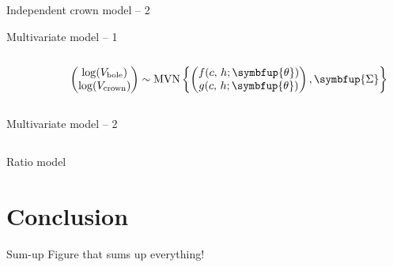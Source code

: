 \documentclass[sectiontocframe default=off, aspectratio=169]{beamer}
\newcommand{\Vbft}{V_{\text{bole}}}
\newcommand{\Vcrn}{V_{\text{crown}}}
\newcommand{\Sigmabf}{\symbfup{\Sigma}}
\DeclareMathOperator{\MVN}{MVN}
\begin{document}
\begin{frame}{Independent crown model -- 2}
	\begin{center}
		
	\end{center}
\end{frame}

\begin{frame}{Multivariate model -- 1}
	\begin{columns}
		\begin{column}{0.5\textwidth}
			\begin{center}
				
			\end{center}
		\end{column}
		\begin{column}{0.5\textwidth}
			\[
				\begin{pmatrix}
					\log(\Vbft) \\
					\log(\Vcrn)
				\end{pmatrix}
				\sim
				\MVN\left\{ \begin{pmatrix}
					f(c, \, h; \symbfup{\theta}) \\
					g(c, \, h; \symbfup{\theta}) \\
				\end{pmatrix}, \Sigmabf \right\}
			\]
		\end{column}
	\end{columns}
\end{frame}

\begin{frame}{Multivariate model -- 2}
	\begin{columns}
		\begin{column}{0.5\textwidth}
			\begin{center}
				
			\end{center}
		\end{column}
		\begin{column}{0.5\textwidth}
			\begin{center}
				
			\end{center}
		\end{column}
	\end{columns}
\end{frame}

\begin{frame}{Ratio model}
	
\end{frame}

\section{Conclusion}
\begin{frame}{Sum-up}
	Figure that sums up everything!
\end{frame}
\end{document}
